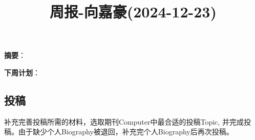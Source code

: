 \documentclass[11pt,a4paper]{article}
\title{周报-向嘉豪(2024-12-23)}
\renewcommand{\maketitle}{
  \begin{center}
    \LARGE\bfseries\thetitle
  \end{center}
}
\begin{document}
\maketitle

\noindent \textbf{摘要}：

\noindent \textbf{下周计划}： 


\subsection{投稿}

补充完善投稿所需的材料，选取期刊Computer中最合适的投稿Topic, 并完成投稿。由于缺少个人Biography被退回，补充完个人Biography后再次投稿。




% 
% 
\end{document}
